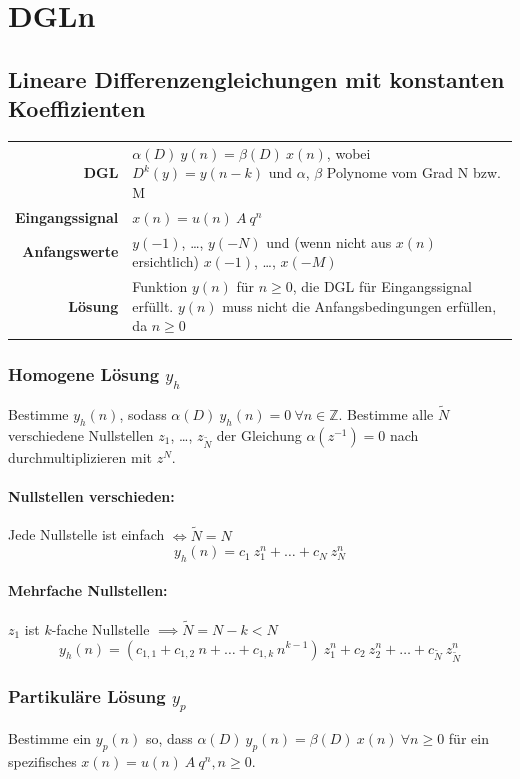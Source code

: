 \documentclass[10pt,a4paper]{article}
\newcommand{\fancythumb}[2]{
	\addthumb{#1}{\large\sffamily\textbf{\space\space#1\vspace{5pt}}}{white}{#2}
}
\begin{document}
\section*{DGLn}
\fancythumb{DGL}{magenta}
\subsection*{Lineare Differenzengleichungen mit konstanten Koeffizienten}
\begin{tabular}{r p{12cm}}
	\textbf{DGL} & $\alpha(D) ~ y(n) = \beta(D) ~ x(n)$, wobei $D^k(y) = y(n-k)$ und $\alpha$, $\beta$ Polynome vom Grad N bzw. M \\
	\textbf{Eingangssignal} & $x(n) = u(n) ~ A ~ q^n$ \\
	\textbf{Anfangswerte} & $y(-1)$, …, $y(-N)$ und (wenn nicht aus $x(n)$ ersichtlich) $x(-1)$, …, $x(-M)$ \\
	\textbf{Lösung} & Funktion $y(n)$ für $n \geq 0$, die DGL für Eingangssignal erfüllt. $y(n)$ muss nicht die Anfangsbedingungen erfüllen, da $n \geq 0$
\end{tabular}

\subsubsection*{Homogene Lösung $y_h$}
Bestimme $y_h(n)$, sodass $\alpha(D) ~ y_h(n) = 0 ~ \forall n \in \mathbb Z$. Bestimme alle $\tilde N$ verschiedene Nullstellen $z_1$, …, $z_{\tilde N}$ der Gleichung $\alpha(z^{-1}) = 0$ nach durchmultiplizieren mit $z^N$.

\paragraph{Nullstellen verschieden:} Jede Nullstelle ist einfach $\Leftrightarrow \tilde N = N$
\[
	y_h(n) = c_1 ~ z_1^n + … + c_N ~ z_N^n
\]

\paragraph{Mehrfache Nullstellen:} $z_1$ ist $k$-fache Nullstelle $\implies \tilde N = N - k < N$
\[
	y_h(n) = \left(c_{1,1} + c_{1,2} ~ n + … + c_{1,k} ~ n^{k-1}\right) ~ z_1^n + c_2 ~ z_2^n + … + c_{\tilde N} ~ z_{\tilde N}^n
\]

\subsubsection*{Partikuläre Lösung $y_p$}
Bestimme ein $y_p(n)$ so, dass $\alpha(D) ~ y_p(n) = \beta(D) ~ x(n) ~ \forall n \geq 0$ für ein spezifisches $x(n) = u(n) ~ A ~ q^n, n \geq 0$.
\end{document}
